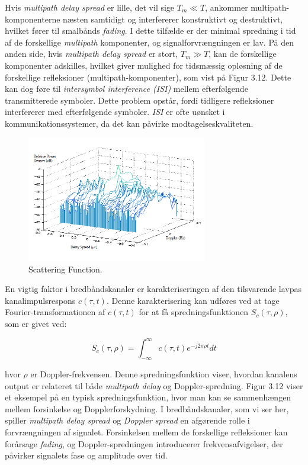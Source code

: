 \documentclass[a4paper,12pt]{book}
\begin{document}
	Hvis \textit{multipath delay spread} er lille, det vil sige $T_m \ll T$, ankommer multipath-komponenterne næsten samtidigt og interfererer konstruktivt og destruktivt, hvilket fører til smalbånds \textit{fading}. I dette tilfælde er der minimal spredning i tid af de forskellige \textit{multipath} komponenter, og signalforvrængningen er lav.
	\newline\newline
	På den anden side, hvis \textit{multipath delay spread} er stort, $T_m \gg T$, kan de forskellige komponenter adskilles, hvilket giver mulighed for tidsmæssig opløsning af de forskellige refleksioner (multipath-komponenter), som vist på Figur 3.12. Dette kan dog føre til \textit{intersymbol interference (ISI)} mellem efterfølgende transmitterede symboler. Dette problem opstår, fordi tidligere refleksioner interfererer med efterfølgende symboler. \textit{ISI} er ofte uønsket i kommunikationssystemer, da det kan påvirke modtagelseskvaliteten.
	
	\begin{figure}[h]
		\centering
		\includegraphics[width=0.7\textwidth]{fig/fig27.png}
		\caption{Scattering Function.}
	\end{figure}
	
	En vigtig faktor i bredbåndskanaler er karakteriseringen af den tilsvarende lavpas kanalimpulsrespons $c(\tau,t)$. Denne karakterisering kan udføres ved at tage Fourier-transformationen af $c(\tau,t)$ for at få spredningsfunktionen $S_c(\tau, \rho)$, som er givet ved:
	
	\[
	S_c(\tau, \rho) = \int_{-\infty}^{\infty} c(\tau, t)e^{-j2\pi \rho t} dt
	\]
	
	hvor $\rho$ er Doppler-frekvensen. Denne spredningsfunktion viser, hvordan kanalens output er relateret til både \textit{multipath delay} og Doppler-spredning. Figur 3.12 viser et eksempel på en typisk spredningsfunktion, hvor man kan se sammenhængen mellem forsinkelse og Dopplerforskydning.
	\newline\newline
	I bredbåndskanaler, som vi ser her, spiller \textit{multipath delay spread} og \textit{Doppler spread} en afgørende rolle i forvrængningen af signalet. Forsinkelsen mellem de forskellige refleksioner kan forårsage \textit{fading}, og Doppler-spredningen introducerer frekvensafvigelser, der påvirker signalets fase og amplitude over tid.
	
\end{document}
